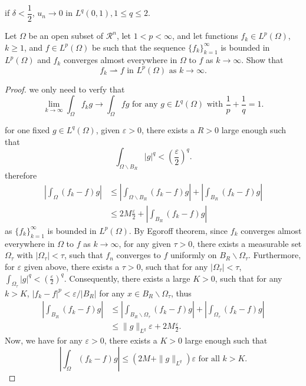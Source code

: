 if $\delta < \dfrac{1}{2}$, $u_n\rightarrow0$ in $L^q(0,1), 1\leqslant q \leqslant 2$.

\begin{lemma}
Let $\Omega$ be an open subset of $\mathcal{R}^n$, let $1<p<\infty$, and let functions $f_k\in L^p(\Omega)$, $k\geqslant1$, and $f\in L^p(\Omega)$ be such that the sequence $\{f_k\}_{k=1}^{\infty}$ is bounded in $L^p(\Omega)$ and $f_k$ converges almost everywhere in $\Omega$ to $f$ as $k\rightarrow \infty$. Show that 
\begin{equation}
	f_k\rightharpoonup f \text{ in } L^p(\Omega) \text{ as } k\rightarrow \infty.
\end{equation}	
\end{lemma}

\begin{proof}
	we only need to verfy that
	\begin{equation}
		\lim_{k\rightarrow\infty}\int_\Omega f_kg\rightarrow\int_\Omega fg \text{ for any } g\in L^q(\Omega) \text{ with } \frac1p+\frac1q=1.
	\end{equation}

	for one fixed $g\in L^q(\Omega)$, given $\varepsilon>0$, there exists a $R>0$ large enough such that 
	\begin{equation}
		\int_{\Omega\backslash B_R}|g|^q < (\frac\varepsilon2)^q.
	\end{equation}
therefore 
\begin{equation}
	\begin{split}
	|\int_\Omega(f_k-f)g|&\leqslant|\int_{\Omega\backslash B_R}(f_k-f)g| + |\int_{B_R}(f_k-f)g|\\
	&\leqslant 2M\frac\varepsilon2 + |\int_{B_R}(f_k-f)g|
\end{split}
\end{equation}
as $\{f_k\}_{k=1}^{\infty}$ is bounded in $L^p(\Omega)$. 
By Egoroff theorem, since $f_k$ converges almost everywhere in $\Omega$ to $f$ as $k\rightarrow \infty$, 
for any given $\tau>0$, there exists a measurable set $\Omega_\tau$ with $|\Omega_\tau|<\tau$, 
such that $f_n$ converges to $f$ uniformly on $B_R\backslash \Omega_\tau$. 
Furthermore, for $\varepsilon$ given above, there exists a $\tau>0$, 
such that for any $|\Omega_\tau|<\tau$, $\int_{\Omega_\tau}|g|^q<(\frac{\varepsilon}{2})^q.$ 
Consequently, there exists a large $K>0$, 
such that for any $k>K$, $|f_k-f|^p<\varepsilon/|B_R|$ for any $x\in B_R\backslash \Omega_\tau$, thus
\begin{equation}
	\begin{split}
		|\int_{B_R}(f_k-f)g|&\leqslant |\int_{B_R\backslash \Omega_\tau}(f_k-f)g| 
		+ |\int_{\Omega_\tau}(f_k-f)g|\\
		&\leqslant \|g\|_{L^q}\varepsilon +2M\frac{\varepsilon}{2}.
	\end{split}
\end{equation}
Now, we have for any $\varepsilon>0$, there exists a $K>0$ large enough such that 
\begin{equation}
	|\int_\Omega(f_k-f)g|\leqslant (2M+ \|g\|_{L^q})\varepsilon \text{ for all } k> K.
\end{equation}
\end{proof}

